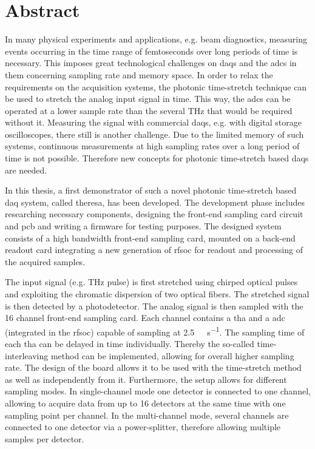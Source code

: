 \chapter*{Abstract}
In many physical experiments and applications, e.g. beam diagnostics, measuring events occurring in the time range of femtoseconds over long periods of time is necessary. 
This imposes great technological challenges on \glspl{daq} and the \glspl{adc} in them concerning sampling rate and memory space.
In order to relax the requirements on the acquisition systems, the photonic time-stretch technique can be used to stretch the analog input signal in time.
This way, the \glspl{adc} can be operated at a lower sample rate than the several \si{\THz} that would be required without it. 
Measuring the signal with commercial \glspl{daq}, e.g. with digital storage oscilloscopes, there still is another challenge.
Due to the limited memory of such systems, continuous measurements at high sampling rates over a long period of time is not possible.
Therefore new concepts for photonic time-stretch based \glspl{daq} are needed.

In this thesis, a first demonstrator of such a novel photonic time-stretch based \gls{daq} system, called \gls{theresa}, has been developed.
The development phase includes researching necessary components, designing the front-end sampling card circuit and \gls{pcb} and writing a firmware for testing purposes.
The designed system consists of a high bandwidth front-end sampling card, mounted on a back-end readout card integrating a new generation of \gls{rfsoc} for readout and processing of the acquired samples.

The input signal (e.g. \si{\tera \hertz} pulse) is first stretched using chirped optical pulses and exploiting the chromatic dispersion of two optical fibers.
The stretched signal is then detected by a photodetector.
The analog signal is then sampled with the 16 channel front-end sampling card.
Each channel contains a \gls{tha} and a \gls{adc} (integrated in the \gls{rfsoc}) capable of sampling at \SI{2.5}{\giga \sample \per \second}.
The sampling time of each \gls{tha} can be delayed in time individually. 
Thereby the so-called time-interleaving method can be implemented, allowing for overall higher sampling rate.
The design of the board allows it to be used with the time-stretch method as well as independently from it.
Furthermore, the setup allows for different sampling modes.
In single-channel mode one detector is connected to one channel, allowing to acquire data from up to 16 detectors at the same time with one sampling point per channel.
In the multi-channel mode, several channels are connected to one detector via a power-splitter, therefore allowing multiple samples per detector.

